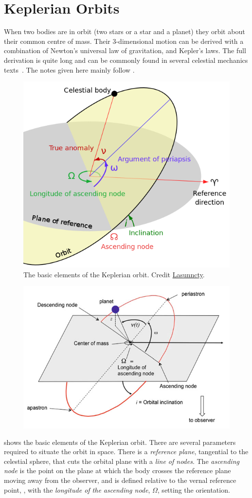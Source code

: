 

\section{Keplerian Orbits}

When two bodies are in orbit (two stars or a star and a planet) they orbit about their common centre of mass.
Their 3-dimensional motion can be derived with a combination of Newton's universal law of gravitation, and Kepler's laws.
The full derivation is quite long and can be commonly found in several celestial mechanics texts~\citep[e.g.][]{moulton_introduction_1914, perryman_exoplanet_2011, fitzpatrick_introduction_2012}.
The notes given here mainly follow \citep{bozza_methods_2016}.

\begin{figure}
    \centering
    \includegraphics[width=0.3\linewidth]{figures/fundamental_rv/orbit}
    \caption{The basic elements of the Keplerian orbit.
        Credit \href{https://commons.wikimedia.org/w/index.php?curid=8971052}{Lasunncty}.}
    \label{fig:orbit}
\end{figure}
\begin{figure}
    \centering
    \includegraphics[width=0.5\linewidth]{figures/fundamental_rv/orbit_diagram}
    \caption{}
    \label{fig:orbitdiagram}
\end{figure}

 shows the basic elements of the Keplerian orbit.
There are several parameters required to situate the orbit in space.
There is a \textit{reference plane}, tangential to the celestial sphere, that cuts the orbital plane with a \textit{line of nodes}.
The \textit{ascending node} is the point on the plane at which the body crosses the reference plane moving away from the observer, and is defined relative to the vernal reference point, \Aries, with the \textit{longitude of the ascending node}, $\Omega$, setting the orientation.

